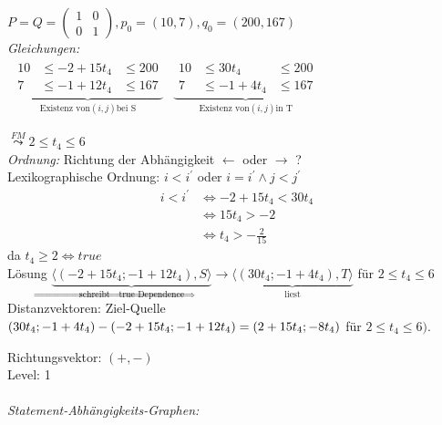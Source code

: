 $P = Q =
\left(
\begin{array}{cc}
1 & 0 \\
0 & 1
\end{array}
\right), p_0 = (10,7), q_0 = (200,167)$
~\\
\textit{Gleichungen:}\\

$\begin{array}{cc}
\underbrace{
\begin{array}{ccc}
10 &\leq -2+15t_4 &\leq 200 \\
7  &\leq -1+12t_4 &\leq 167
\end{array}
}_{\text{Existenz von} (i,j) \text{bei S}} &
\underbrace{
\begin{array}{ccc}
10 &\leq 30t_4 &\leq 200 \\
 7 &\leq-1+4t_4 &\leq 167
\end{array}
}_{\text{Existenz von} (i,j) \text{in T}}

\end{array}$

$\stackrel{FM}{\leadsto} 2 \leq t_4 \leq 6$
~\\
\textit{Ordnung:} Richtung der Abhängigkeit $\leftarrow$ oder $\rightarrow$ ?\\

Lexikographische Ordnung: $i < i^\prime$ oder $i = i^\prime \land j < j^\prime$\\
\begin{equation}
\begin{split}
i<i^\prime &\Leftrightarrow -2+15t_4 < 30t_4\\
           &\Leftrightarrow    15t_4 > -2\\
           &\Leftrightarrow      t_4 >-\frac{2}{15}
\end{split}
\end{equation}
da $t_4 \geq 2 \Leftrightarrow true$\\
Lösung $\underbrace{\langle (-2 + 15t_4; -1+12t_4), S \rangle}_{\text{schreibt} \Rightarrow \text{true Dependence}} \rightarrow
 \underbrace{\langle (30t_4;-1+4t_4), T \rangle}_{\text{liest}}$ für $2 \leq t_4 \leq 6$\\

Distanzvektoren: \glqq Ziel-Quelle\grqq\\
$(30t_4; -1+4t_4) - (-2+15t_4; -1+12t_4) =\\
(2+15t_4; -8t_4)$ für $2\leq t_4 \leq 6)$.

Richtungsvektor: $(+,-)$\\
Level: 1\\
~\\
\textit{Statement-Abhängigkeits-Graphen:}\\

